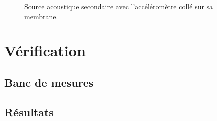 \begin{figure}[!ht]
    \centering
    \caption{Source acoustique secondaire avec l'accéléromètre collé sur sa membrane.}
    \label{fig:HPPeerless_WithAcc}
\end{figure}

\section{Vérification}
\subsection{Banc de mesures}

\subsection{Résultats}